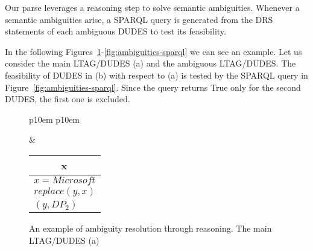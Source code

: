 Our parse leverages a reasoning step to solve semantic ambiguities.
%
Whenever a semantic ambiguities arise, a SPARQL query is generated from the DRS statements of each ambiguous DUDES to test its feasibility.

In the following Figures~\ref{fig:ambiguities-resolution-a}-\ref{fig:ambiguities-sparql} we can see an example.
%
Let us consider the main LTAG/DUDES (a) and the ambiguous LTAG/DUDES.
%
The feasibility of DUDES in (b) with respect to (a) is tested by the SPARQL query in Figure~\ref{fig:ambiguities-sparql}. Since the query returns True only for the second DUDES, the first one is excluded.

\begin{figure}[tp]
\caption{An example of ambiguity resolution through reasoning. The main LTAG/DUDES (a)}
\label{fig:ambiguities-resolution-a}
\begin{tabular}{ p{10em} p{10em} }
	\begin{center}
	\begin{tikzpicture}
	\Tree [.S [.VP [.V is ] [.DP$_1$ Microsoft ] ] [.DP$_2\downarrow$ ] ]
	\end{tikzpicture}
	\end{center}		
	&
	\begin{center}
	\begin{tabular}{|c|l|}
		\hline
		\mbox{} & x \\ 
		\hline
		\multicolumn{2}{|l|}{
			$x=Microsoft$
		}\\
		\multicolumn{2}{|l|}{
			$replace(y,x)$
		}\\
		\hline
		\multicolumn{2}{|l|}{
			\mbox{$(y,DP_2)$}
		}\\
		\hline
	\end{tabular}
	\end{center}
\end{tabular}
\end{figure}


